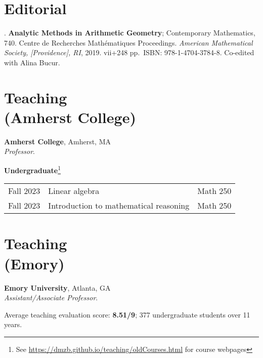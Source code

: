 \documentclass[margin,line]{res}
\newcounter{pubs}
\newcommand{\defi}[1]{\textsf{#1}} 				%
\begin{document}
\begin{resume}
\section{\sc Editorial}


 .  \textbf{Analytic Methods in Arithmetic Geometry}; Contemporary
Mathematics, 740. Centre de Recherches Math\'ematiques Proceedings. \emph{American Mathematical Society, [Providence], RI}, 2019. vii+248 pp.~ISBN: 978-1-4704-3784-8. Co-edited with Alina Bucur. \vspace{.08cm}\\ 


\newpage
\vspace{-7pt}
\section{\sc Teaching \\ (Amherst College)}

{\bf Amherst College}, Amherst, MA\\
\emph{Professor}. 
\vspace{2pt}




{\bf Undergraduate}\footnote{See \url{https://dmzb.github.io/teaching/oldCourses.html} for course webpages}
\vspace*{-.1in}

\begin{tabular}{rll}
 Fall 2023 & \defi{Linear algebra} & Math 250\\  
 Fall 2023 & \defi{Introduction to mathematical reasoning} & Math 250\\  
\end{tabular}

\vspace{-7pt}
\section{\sc Teaching \\ (Emory)}

{\bf Emory University}, Atlanta, GA\\
\emph{Assistant/Associate Professor}. 
\vspace{2pt}

Average teaching evaluation score: \textbf{8.51/9}; 377 undergraduate students over 11 years. 
\vspace{2pt}




\end{resume}
\end{document}

